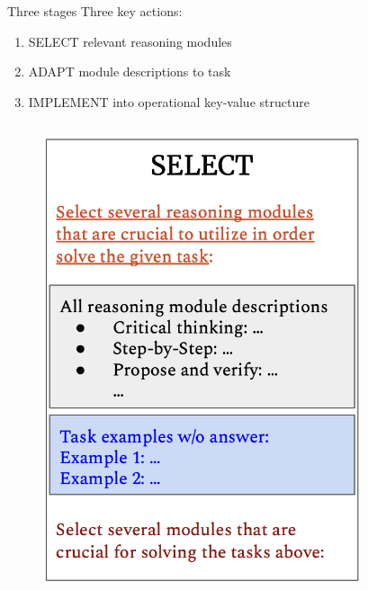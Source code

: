 \documentclass[aspectratio=169]{beamer}
\begin{document}
\begin{frame}{Three stages}
Three key actions:
\begin{enumerate}
\item SELECT relevant reasoning modules
\item ADAPT module descriptions to task
\item IMPLEMENT into operational key-value structure
\end{enumerate}
\pause
\begin{columns}
\begin{column}{0.3\textwidth}
\begin{figure}
    \centering
    \includegraphics[width=0.8\linewidth]{select.png}
\end{figure}
\end{column}
\pause
\begin{column}{0.3\textwidth}
\begin{figure}
    \centering

\end{figure}
\end{column}
\end{columns}
\end{frame}
\end{document}
